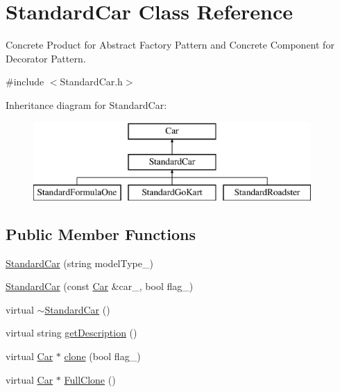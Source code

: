 \hypertarget{class_standard_car}{}\section{Standard\+Car Class Reference}
\label{class_standard_car}


Concrete Product for Abstract Factory Pattern and Concrete Component for Decorator Pattern.  




{\ttfamily \#include $<$Standard\+Car.\+h$>$}

Inheritance diagram for Standard\+Car\+:\begin{figure}[H]
\begin{center}
\leavevmode
\includegraphics[height=3.000000cm]{class_standard_car}
\end{center}
\end{figure}
\subsection*{Public Member Functions}
\begin{DoxyCompactItemize}
\item 
\mbox{\hyperlink{class_standard_car_ae1b58891e1b5fa8c6697768e25583ba8}{Standard\+Car}} (string model\+Type\+\_\+)
\item 
\mbox{\hyperlink{class_standard_car_af58be688bd401181b0d3fc91358c9431}{Standard\+Car}} (const \mbox{\hyperlink{class_car}{Car}} \&car\+\_\+, bool flag\+\_\+)
\item 
virtual \mbox{\hyperlink{class_standard_car_a832e00072d6908d61731b9b78b815fb8}{$\sim$\+Standard\+Car}} ()
\item 
virtual string \mbox{\hyperlink{class_standard_car_a54076de04cd09cdc102947f088eb8132}{get\+Description}} ()
\item 
virtual \mbox{\hyperlink{class_car}{Car}} $\ast$ \mbox{\hyperlink{class_standard_car_a2fd5dd06bebd68db247bab73bd2176be}{clone}} (bool flag\+\_\+)
\item 
virtual \mbox{\hyperlink{class_car}{Car}} $\ast$ \mbox{\hyperlink{class_standard_car_a4fda894219093e86a4c9b1eeb0edc523}{Full\+Clone}} ()
\end{DoxyCompactItemize}
